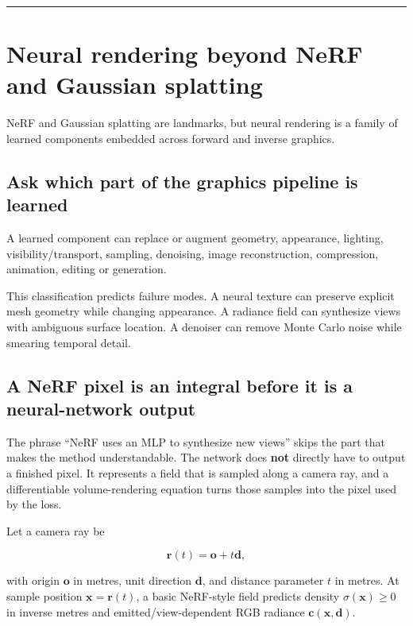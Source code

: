 \begin{center}\rule{0.5\linewidth}{0.5pt}\end{center}

\chapter{Neural rendering beyond NeRF and Gaussian splatting}\label{04-visual-computing-ii-ch035-neural-rendering-beyond-nerf-and-gaussian-splatting}

NeRF and Gaussian splatting are landmarks, but neural rendering is a family of learned components embedded across forward and inverse graphics.

\section{Ask which part of the graphics pipeline is learned}\label{04-visual-computing-ii-ch035-ask-which-part-of-the-graphics-pipeline-is-learned}

A learned component can replace or augment geometry, appearance, lighting, visibility/transport, sampling, denoising, image reconstruction, compression, animation, editing or generation.

This classification predicts failure modes. A neural texture can preserve explicit mesh geometry while changing appearance. A radiance field can synthesize views with ambiguous surface location. A denoiser can remove Monte Carlo noise while smearing temporal detail.

\section{A NeRF pixel is an integral before it is a neural-network output}\label{04-visual-computing-ii-ch035-a-nerf-pixel-is-an-integral-before-it-is-a-neural-network-output}

The phrase ``NeRF uses an MLP to synthesize new views'' skips the part that makes the method understandable. The network does \textbf{not} directly have to output a finished pixel. It represents a field that is sampled along a camera ray, and a differentiable volume-rendering equation turns those samples into the pixel used by the loss.

Let a camera ray be

\[\mathbf r(t)=\mathbf o+t\mathbf d,\]

with origin \(\mathbf o\) in metres, unit direction \(\mathbf d\), and distance parameter \(t\) in metres. At sample position \(\mathbf x=\mathbf r(t)\), a basic NeRF-style field predicts density \(\sigma(\mathbf x)\ge0\) in inverse metres and emitted/view-dependent RGB radiance \(\mathbf c(\mathbf x,\mathbf d)\).

